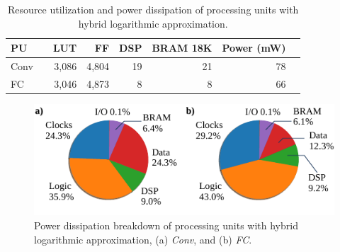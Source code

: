 \begin{table}[!h]\centering
	\caption{Resource utilization and power dissipation of processing units with hybrid logarithmic approximation.}\label{tab:resource_log}
	\scriptsize
\begin{tabular}{lrrrrrrr}\toprule
	\textbf{PU} & &\textbf{LUT} &\textbf{FF} &\textbf{DSP} &\textbf{BRAM 18K} &\textbf{Power (mW)} \\\midrule
	Conv & &3,086 &4,804 &19 &21 &78 \\
	FC & &3,046 &4,873 &8 &8 &66 \\
	\bottomrule
\end{tabular}
\end{table}

\begin{figure}[!h]
	\centering
	\includegraphics[width=1\columnwidth]{../figures/power_dissipation_breakdown_log-4.pdf}
	\caption{Power dissipation breakdown of processing units with hybrid logarithmic approximation, (a) \emph{Conv}, and (b) \emph{FC}.}
	\label{fig:power_dissipation_breakdown_log_4}
\end{figure}



